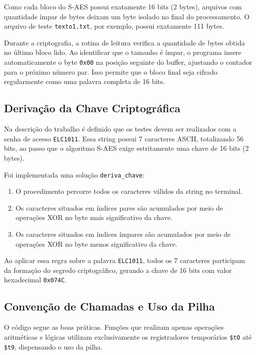 \documentclass[12pt,a4paper]{article}
\begin{document}
Como cada bloco do S-AES possui exatamente 16 bits (2 bytes), arquivos com quantidade ímpar de bytes deixam um byte isolado no final do processamento. O arquivo de teste \texttt{texto1.txt}, por exemplo, possui exatamente 111 bytes.

Durante a criptografia, a rotina de leitura verifica a quantidade de bytes obtida no último bloco lido. Ao identificar que o tamanho é ímpar, o programa insere automaticamente o byte \texttt{0x00} na posição seguinte do buffer, ajustando o contador para o próximo número par. Isso permite que o bloco final seja cifrado regularmente como uma palavra completa de 16 bits.

\subsection{Derivação da Chave Criptográfica}

Na descrição do trabalho é definido que os testes devem ser realizados com a senha de acesso \texttt{ELC1011}. Essa string possui 7 caracteres ASCII, totalizando 56 bits, ao passo que o algoritmo S-AES exige estritamente uma chave de 16 bits (2 bytes).

Foi implementada uma solução \texttt{deriva\_chave}:

\begin{enumerate}
    \item O procedimento percorre todos os caracteres válidos da string no terminal.
    \item Os caracteres situados em índices pares são acumulados por meio de operações XOR no byte mais significativo da chave.
    \item Os caracteres situados em índices ímpares são acumulados por meio de operações XOR no byte menos significativo da chave.
\end{enumerate}

Ao aplicar essa regra sobre a palavra \texttt{ELC1011}, todos os 7 caracteres participam da formação do segredo criptográfico, gerando a chave de 16 bits com valor hexadecimal \texttt{0x074C}.

\subsection{Convenção de Chamadas e Uso da Pilha}

O código segue as boas práticas. Funções que realizam apenas operações aritméticas e lógicas utilizam exclusivamente os registradores temporários \texttt{\$t0} até \texttt{\$t9}, dispensando o uso da pilha.
\end{document}
